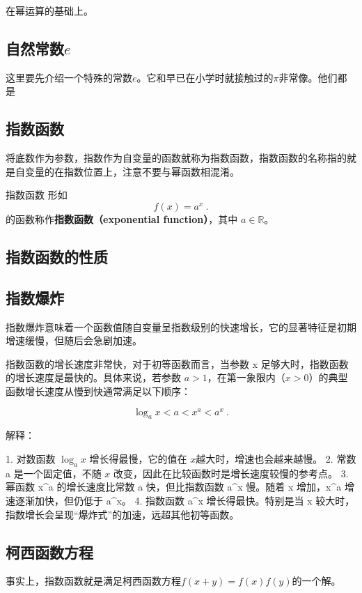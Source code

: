 
\begin{issues}
\issueDraft
\end{issues}


在幂运算的基础上。

\subsection{自然常数$e$}

这里要先介绍一个特殊的常数$e$。它和早已在小学时就接触过的$\pi$非常像。他们都是


\subsection{指数函数}

将底数作为参数，指数作为自变量的函数就称为指数函数，指数函数的名称指的就是自变量的在指数位置上，注意不要与幂函数相混淆。

\begin{definition}{指数函数}
形如
\begin{equation}
f(x) = a^x~.
\end{equation}
的函数称作\textbf{指数函数（exponential function）}，其中 $a\in\mathbb R$。
\end{definition}
\subsection{指数函数的性质}

\subsection{指数爆炸}

指数爆炸意味着一个函数值随自变量呈指数级别的快速增长，它的显著特征是初期增速缓慢，但随后会急剧加速。

指数函数的增长速度非常快，对于初等函数而言，当参数 x 足够大时，指数函数的增长速度是最快的。具体来说，若参数 $a > 1$，在第一象限内（$x > 0$）的典型函数增长速度从慢到快通常满足以下顺序：

\begin{equation}
\log_a{x} < a < x^a < a^x~.
\end{equation}

解释：

	1.	对数函数 $\log_a{x}$ 增长得最慢，它的值在 $x$越大时，增速也会越来越慢。
	2.	常数 a 是一个固定值，不随 $x$ 改变，因此在比较函数时是增长速度较慢的参考点。
	3.	幂函数 x^a 的增长速度比常数 a 快，但比指数函数 a^x 慢。随着 x 增加，x^a 增速逐渐加快，但仍低于 a^x。
	4.	指数函数 a^x 增长得最快。特别是当 x 较大时，指数增长会呈现“爆炸式”的加速，远超其他初等函数。


\subsection{柯西函数方程}

事实上，指数函数就是满足柯西函数方程$f(x+y)=f(x)f(y)$的一个解。